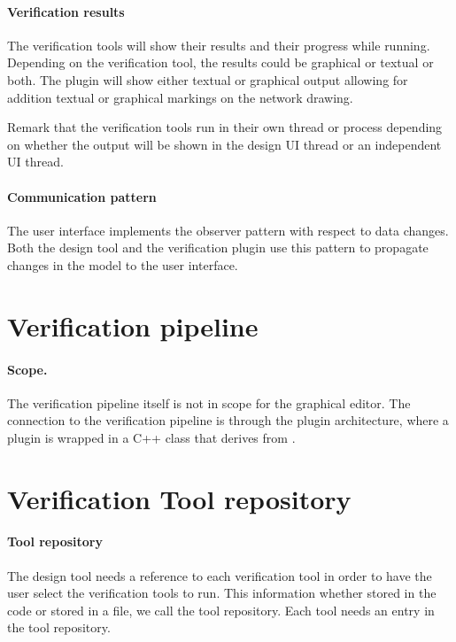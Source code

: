 \paragraph{Verification results} The verification tools 
will show their results and their progress while running. 
Depending on the verification tool, the results could be
graphical or textual or both. The plugin will show either
textual or graphical output allowing for addition textual 
or graphical markings on the network drawing.

Remark that the verification tools run in their own
thread or process depending on whether the output will be
shown in the design UI thread or an independent 
UI thread.

\paragraph{Communication pattern} The user interface implements
the observer pattern with respect to data changes.
Both the design tool and the verification plugin use this pattern to
propagate changes in the model to the user interface.

\section{Verification pipeline}

\paragraph{Scope.} The verification pipeline itself is
not in scope for the graphical editor. The connection to the verification 
pipeline is through the plugin architecture, where a plugin is wrapped 
in a C++ class that derives from .


\section{Verification Tool repository}

\paragraph{Tool repository} The design tool needs a reference to each 
verification tool in order to have the user select the 
verification tools to run. This information whether stored
in the code or stored in a file, we call the tool repository.
Each tool needs an entry in the tool repository.

